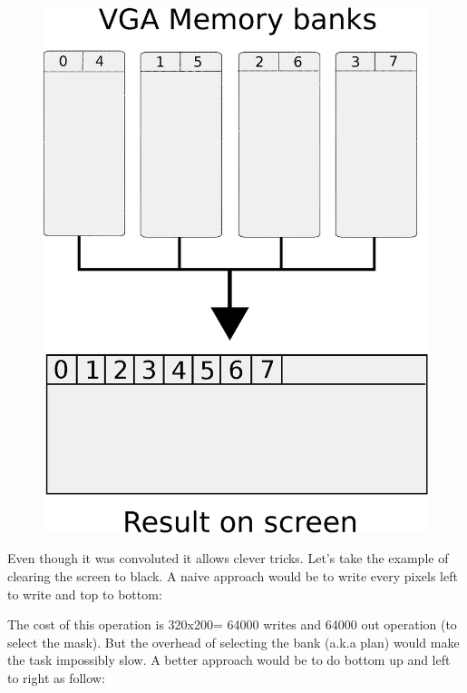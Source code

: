\documentclass[book.tex]{subfiles}
\begin{document}
\begin{figure}[H]
\centering
\includegraphics[width=\textwidth]{imgs/vga_ram_screen_layout.eps}
\end{figure}

Even though it was convoluted it allows clever tricks. Let's take the example of clearing the screen to black. A naive approach would be to write every pixels left to write and top to bottom:

\begin{minipage}{\textwidth}

\end{minipage}

The cost of this operation is 320x200= 64000 writes and 64000 out operation (to select the mask).
But the overhead of selecting the bank (a.k.a plan) would make the task impossibly slow. A better approach would be to do bottom up and left to right as follow:\\
\par
\begin{minipage}{\textwidth}

\end{minipage}
\end{document}
